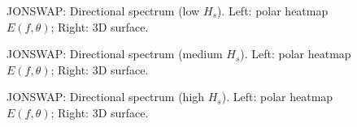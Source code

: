 \documentclass[11pt,letterpaper]{article}
\begin{document}
\begin{figure}[H]\centering
  \begin{minipage}{0.49\textwidth}
    \resizebox{\linewidth}{!}{}
  \end{minipage}\hfill
  \begin{minipage}{0.49\textwidth}
    \resizebox{\linewidth}{!}{}
  \end{minipage}
  \caption{JONSWAP: Directional spectrum (low $H_s$). Left: polar heatmap $E(f,\theta)$; Right: 3D surface.}
  \label{fig:jonswap_spec_low}
\end{figure}
\clearpage

\begin{figure}[H]\centering
  \begin{minipage}{0.49\textwidth}
    \resizebox{\linewidth}{!}{}
  \end{minipage}\hfill
  \begin{minipage}{0.49\textwidth}
    \resizebox{\linewidth}{!}{}
  \end{minipage}
  \caption{JONSWAP: Directional spectrum (medium $H_s$). Left: polar heatmap $E(f,\theta)$; Right: 3D surface.}
  \label{fig:jonswap_spec_medium}
\end{figure}
\clearpage

\begin{figure}[H]\centering
  \begin{minipage}{0.49\textwidth}
    \resizebox{\linewidth}{!}{}
  \end{minipage}\hfill
  \begin{minipage}{0.49\textwidth}
    \resizebox{\linewidth}{!}{}
  \end{minipage}
  \caption{JONSWAP: Directional spectrum (high $H_s$). Left: polar heatmap $E(f,\theta)$; Right: 3D surface.}
  \label{fig:jonswap_spec_high}
\end{figure}
\clearpage
\end{document}
